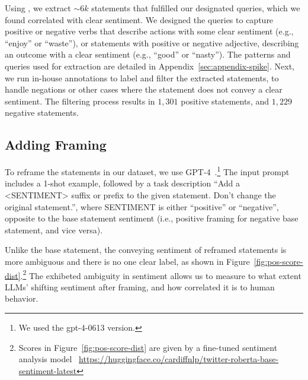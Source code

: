 Using \spike, we extract ${\sim}6k$ statements that fulfilled our designated queries, which we found correlated with clear sentiment. We designed the queries to capture positive or negative verbs that describe actions with some clear sentiment (e.g., ``enjoy'' or ``waste''), or statements with positive or negative adjective, describing an outcome with a clear sentiment (e.g., ``good'' or ``nasty''). The patterns and queries used for extraction are detailed in Appendix~\ref{sec:appendix-spike}.
Next, we run in-house annotations to label and filter the extracted statements, to handle negations or other cases where the statement does not convey a clear sentiment. 
The filtering process results in $1,301$ positive statements, and $1,229$ negative statements.


\subsection{Adding Framing}\label{sec:adding-framing}

To reframe the statements in our dataset, we use GPT-4~\cite{achiam2023gpt}.\footnote{We used the gpt-4-0613 version.} 
The input prompt includes a 1-shot example, followed by a task description ``Add a <SENTIMENT> suffix or prefix to the given statement. Don't change the original statement.'', where SENTIMENT is either ``positive'' or ``negative'', opposite to the base statement sentiment (i.e., positive framing for negative base statement, and vice versa).

Unlike the base statement, the conveying sentiment of reframed statements is more ambiguous and there is no one clear label, as shown in Figure~\ref{fig:pos-score-dist}.\footnote{Scores in Figure~\ref{fig:pos-score-dist} are given by a fine-tuned sentiment analysis model ~\url{https://huggingface.co/cardiffnlp/twitter-roberta-base-sentiment-latest}}
The exhibeted ambiguity in sentiment allows us to measure to what extent LLMs' shifting sentiment after framing, and how correlated it is to human behavior.



